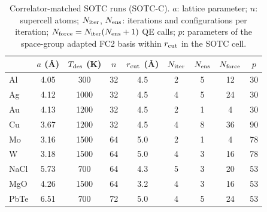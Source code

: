 \begin{table}[t]
\caption{Correlator-matched SOTC runs (SOTC-C). $a$: lattice parameter; $n$: supercell atoms; $N_{\rm iter}$, $N_{\rm ens}$: iterations and configurations per iteration; $N_{\rm force}=N_{\rm iter}(N_{\rm ens}+1)$ QE calls; $p$: parameters of the space-group adapted FC2 basis within $r_{\rm cut}$ in the SOTC cell.}
\label{tab:runs}
\begin{ruledtabular}
\begin{tabular}{lcccccccc}
 & $a$ (\AA) & $T_{\rm des}$ (K) & $n$ & $r_{\rm cut}$ (\AA) & $N_{\rm iter}$ & $N_{\rm ens}$ & $N_{\rm force}$ & $p$\\
\hline
Al & 4.05 & 300 & 32 & 4.5 & 2 & 5 & 12 & 30\\
Ag & 4.12 & 1000 & 32 & 4.5 & 4 & 5 & 24 & 30\\
Au & 4.13 & 1200 & 32 & 4.5 & 2 & 1 & 4 & 30\\
Cu & 3.67 & 1200 & 32 & 4.5 & 4 & 8 & 36 & 90\\
Mo & 3.16 & 1500 & 64 & 5.0 & 2 & 1 & 4 & 78\\
W & 3.18 & 1500 & 64 & 5.0 & 4 & 3 & 16 & 78\\
NaCl & 5.73 & 700 & 64 & 4.3 & 5 & 3 & 20 & 53\\
MgO & 4.26 & 1500 & 64 & 3.2 & 4 & 3 & 16 & 53\\
PbTe & 6.51 & 700 & 72 & 5.0 & 4 & 5 & 24 & 53\\
\end{tabular}
\end{ruledtabular}
\end{table}
